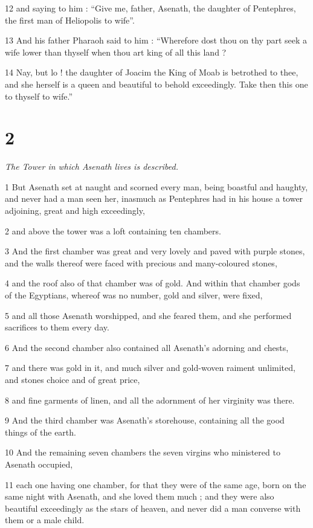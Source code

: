 12 and saying to him : “Give me, father, Asenath, the daughter of Pentephres, the first man of Heliopolis to wife”. 

13 And his father Pharaoh said to him : “Wherefore dost thou on thy part seek a wife lower than thyself when thou art king of all this land ? 

14 Nay, but lo ! the daughter of Joacim the King of Moab is betrothed to thee, and she herself is a queen and beautiful to behold exceedingly. Take then this one to thyself to wife.”

\chapter{2}

\par \textit{The Tower in which Asenath lives is described.}

1 But Asenath set at naught and scorned every man, being boastful and haughty, and never had a man seen her, inasmuch as Pentephres had in his house a tower adjoining, great and high exceedingly, 

2 and above the tower was a loft containing ten chambers. 

3 And the first chamber was great and very lovely and paved with purple stones, and the walls thereof were faced with precious and many-coloured stones, 

4 and the roof also of that chamber was of gold. And within that chamber gods of the Egyptians, whereof was no number, gold and silver, were fixed, 

5 and all those Asenath worshipped, and she feared them, and she performed sacrifices to them every day. 

6 And the second chamber also contained all Asenath's adorning and chests, 

7 and there was gold in it, and much silver and gold-woven raiment unlimited, and stones choice and of great price, 

8 and fine garments of linen, and all the adornment of her virginity was there. 

9 And the third chamber was Asenath's storehouse, containing all the good things of the earth. 

10 And the remaining seven chambers the seven virgins who ministered to Asenath occupied, 

11 each one having one chamber, for that they were of the same age, born on the same night with Asenath, and she loved them much ; and they were also beautiful exceedingly as the stars of heaven, and never did a man converse with them or a male child. 

